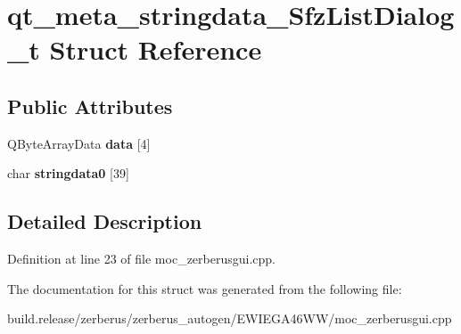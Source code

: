 \hypertarget{structqt__meta__stringdata___sfz_list_dialog__t}{}\section{qt\+\_\+meta\+\_\+stringdata\+\_\+\+Sfz\+List\+Dialog\+\_\+t Struct Reference}
\label{structqt__meta__stringdata___sfz_list_dialog__t}
\subsection*{Public Attributes}
\begin{DoxyCompactItemize}
\item 
\mbox{\label{structqt__meta__stringdata___sfz_list_dialog__t_ad1785c3c897e62e080817f4151ca4b8b}} 
Q\+Byte\+Array\+Data {\bfseries data} \mbox{[}4\mbox{]}
\item 
\mbox{\label{structqt__meta__stringdata___sfz_list_dialog__t_aa6c0afe91a58bc81403b5070f586e6ff}} 
char {\bfseries stringdata0} \mbox{[}39\mbox{]}
\end{DoxyCompactItemize}


\subsection{Detailed Description}


Definition at line 23 of file moc\+\_\+zerberusgui.\+cpp.



The documentation for this struct was generated from the following file\+:\begin{DoxyCompactItemize}
\item 
build.\+release/zerberus/zerberus\+\_\+autogen/\+E\+W\+I\+E\+G\+A46\+W\+W/moc\+\_\+zerberusgui.\+cpp\end{DoxyCompactItemize}
